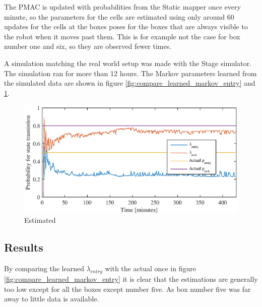The PMAC is updated with probabilities from the Static mapper once every minute, so the parameters for the cells are estimated using only around $60$ updates for the cells at the boxes poses for the boxes that are always visible to the robot when it moves past them.
This is for example not the case for box number one and six, so they are observed fewer times.

A simulation matching the real world setup was made with the Stage simulator. 
The simulation ran for more than 12 hours. 
The Markov parameters learned from the simulated data are shown in figure \ref{fig:compare_learned_markov_entry} and \ref{fig:compare_learned_markov_exit}.

\begin{figure}
	\centering
	\includegraphics[scale=1]{chapters/evaluation/figures/learning_curve}
	\caption{Estimated }
	\label{fig:compare_learned_markov_exit}
\end{figure}

\subsection{Results}
By comparing the learned $\lambda_{entry}$ with the actual once in figure \ref{fig:compare_learned_markov_entry} it is clear that the estimations are generally too low except for all the boxes except number five.
As box number five was far away to little data is available.

